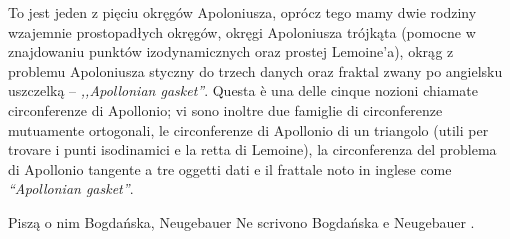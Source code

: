 To jest jeden z pięciu okręgów Apoloniusza, oprócz tego mamy dwie rodziny wzajemnie prostopadłych okręgów, okręgi Apoloniusza trójkąta (pomocne w znajdowaniu punktów izodynamicznych oraz prostej Lemoine'a), okrąg z problemu Apoloniusza styczny do trzech danych oraz fraktal zwany po angielsku uszczelką -- \emph{,,Apollonian gasket''}. %
Questa è una delle cinque nozioni chiamate circonferenze di Apollonio; vi sono inoltre due famiglie di circonferenze mutuamente ortogonali, le circonferenze di Apollonio di un triangolo (utili per trovare i punti isodinamici e la retta di Lemoine), la circonferenza del problema di Apollonio tangente a tre oggetti dati e il frattale noto in inglese come \emph{``Apollonian gasket''}. %

Piszą o nim Bogdańska, Neugebauer \cite[s. 74]{neugebauer_2018} %
Ne scrivono Bogdańska e Neugebauer \cite[p. 74]{neugebauer_2018}. %

%